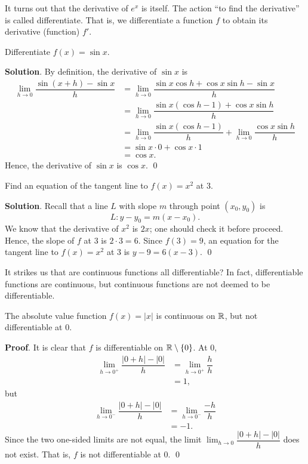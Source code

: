 \documentclass[11pt]{book}
\begin{document}
It turns out that the derivative of $e^x$ is itself. The action ``to find the derivative'' is called differentiate. That is, we differentiate a function $f$ to obtain its derivative (function) $f'$.

\begin{example}
    Differentiate $f(x)=\sin x$.
\end{example}
\textbf{Solution}. By definition, the derivative of $\sin x$ is \begin{align*}
    \lim_{h\to 0}\dfrac{\sin(x+h)-\sin x}{h}&=\lim_{h\to 0}\dfrac{\sin x\cos h+\cos x\sin h-\sin x}{h}\\
    &=\lim_{h\to 0}\dfrac{\sin x(\cos h-1)+\cos x\sin h}{h}\\
    &=\lim_{h\to 0}\dfrac{\sin x(\cos h-1)}{h}+\lim_{h\to 0}\dfrac{\cos x\sin h}{h}\\
    &=\sin x\cdot 0+\cos x\cdot 1\\
    &=\cos x.
\end{align*}
Hence, the derivative of $\sin x$ is $\cos x$. \qed

\begin{example}
    Find an equation of the tangent line to $f(x)=x^2$ at $3$.
\end{example}
\textbf{Solution}. Recall that a line $L$ with slope $m$ through point $(x_0, y_0)$ is $$L:y-y_0=m(x-x_0).$$ We know that the derivative of $x^2$ is $2x$; one should check it before proceed. Hence, the slope of $f$ at $3$ is $2\cdot 3=6$. Since $f(3)=9$, an equation for the tangent line to $f(x)=x^2$ at $3$ is $y-9=6(x-3)$. \qed

It strikes us that are continuous functions all differentiable? In fact, differentiable functions are continuous, but continuous functions are not deemed to be differentiable.

\begin{example}
    The absolute value function $f(x)=|x|$ is continuous on $\mathbb{R}$, but not differentiable at $0$.
\end{example}
\textbf{Proof}. It is clear that $f$ is differentiable on $\mathbb{R}\setminus\{0\}$. At $0$, \begin{align*}
    \lim_{h\to 0^+}\dfrac{|0+h|-|0|}{h}&=\lim_{h\to 0^+}\dfrac{h}{h}\\
    &=1,
\end{align*} but \begin{align*}
    \lim_{h\to 0^-}\dfrac{|0+h|-|0|}{h}&=\lim_{h\to 0^-}\dfrac{-h}{h}\\
    &=-1.
\end{align*} Since the two one-sided limits are not equal, the limit $\displaystyle\lim_{h\to 0}\dfrac{|0+h|-|0|}{h}$ does not exist. That is, $f$ is not differentiable at $0$. \qed
\end{document}

